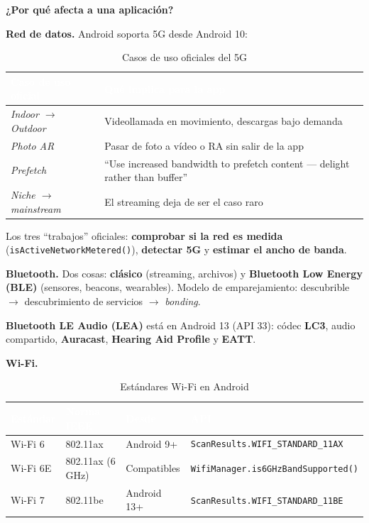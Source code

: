\documentclass[11pt,a4paper]{article}
\newcommand{\code}[1]{\texttt{\color{primary}#1}}
\begin{document}
	\textbf{\color{primary}¿Por qué afecta a una aplicación?}
	
	\textbf{Red de datos.} Android soporta 5G desde Android 10:
	
	\begin{table}[htbp]
		\centering
		\small
		\begin{tabularx}{\textwidth}{@{}>{\RaggedRight\arraybackslash}p{4.5cm} >{\RaggedRight\arraybackslash}X@{}}
			\toprule
			\rowcolor{primary}
			\textcolor{white}{\sffamily\bfseries Caso de uso oficial} & \textcolor{white}{\sffamily\bfseries Qué implica para la app} \\
			\midrule
			\emph{Indoor $\to$ Outdoor} & Videollamada en movimiento, descargas bajo demanda \\
			\rowcolor{soft}
			\emph{Photo AR} & Pasar de foto a vídeo o RA sin salir de la app \\
			\emph{Prefetch} & \enquote{Use increased bandwidth to prefetch content --- delight rather than buffer} \\
			\rowcolor{soft}
			\emph{Niche $\to$ mainstream} & El streaming deja de ser el caso raro \\
			\bottomrule
		\end{tabularx}
		\caption{Casos de uso oficiales del 5G}
	\end{table}
	
	Los tres \enquote{trabajos} oficiales: \textbf{comprobar si la red es medida} (\code{isActiveNetworkMetered()}), \textbf{detectar 5G} y \textbf{estimar el ancho de banda}.
	
	\textbf{Bluetooth.} Dos cosas: \textbf{clásico} (streaming, archivos) y \textbf{Bluetooth Low Energy (BLE)} (sensores, beacons, wearables). Modelo de emparejamiento: descubrible $\to$ descubrimiento de servicios $\to$ \emph{bonding}.
	
	\textbf{Bluetooth LE Audio (LEA)} está en Android 13 (API 33): códec \textbf{LC3}, audio compartido, \textbf{Auracast}, \textbf{Hearing Aid Profile} y \textbf{EATT}.
	
	\textbf{Wi-Fi.}
	
	\begin{table}[htbp]
		\centering
		\small
		\begin{tabular}{@{}l l l l@{}}
			\toprule
			\rowcolor{primary}
			\textcolor{white}{\sffamily\bfseries Estándar} & \textcolor{white}{\sffamily\bfseries Norma IEEE} & \textcolor{white}{\sffamily\bfseries Desde} & \textcolor{white}{\sffamily\bfseries API} \\
			\midrule
			Wi-Fi 6 & 802.11ax & Android 9+ & \code{ScanResults.WIFI\_STANDARD\_11AX} \\
			\rowcolor{soft}
			Wi-Fi 6E & 802.11ax (6 GHz) & Compatibles & \code{WifiManager.is6GHzBandSupported()} \\
			Wi-Fi 7 & 802.11be & Android 13+ & \code{ScanResults.WIFI\_STANDARD\_11BE} \\
			\bottomrule
		\end{tabular}
		\caption{Estándares Wi-Fi en Android}
	\end{table}
	
\end{document}
